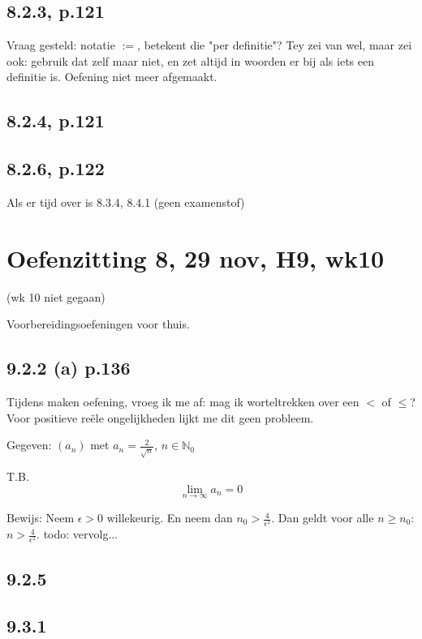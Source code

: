 \documentclass{article}
\begin{document}
\subsection{8.2.3, p.121}
Vraag gesteld: notatie $:=$, betekent die "per definitie"? Tey zei van wel, maar zei ook: gebruik dat zelf maar niet, en zet altijd in woorden er bij als iets een definitie is. 
Oefening niet meer afgemaakt. 

\subsection{8.2.4, p.121}
 
\subsection{8.2.6, p.122}

Als er tijd over is  8.3.4, 8.4.1 (geen examenstof) 

\section{Oefenzitting 8, 29 nov, H9, wk10}
(wk 10 niet gegaan) 

Voorbereidingsoefeningen voor thuis.


\subsection{9.2.2 (a) p.136}

Tijdens maken oefening, vroeg ik me af: mag ik worteltrekken over een $<$ of $\leq$? 
Voor positieve re\"ele ongelijkheden lijkt me dit geen probleem. 

Gegeven: $(a_n)$ met $a_n = \frac{2}{\sqrt{n}}$, $n \in \mathbb{N}_0$

T.B. \[
\lim_{n \to \infty} a_n = 0 \] 

Bewijs: 
Neem $\epsilon > 0$ willekeurig. En neem dan $n_0 > \frac{4}{\epsilon^2}$. Dan geldt voor alle $n \geq n_0$: $n > \frac{4}{\epsilon^2}$. 
todo: vervolg...



\subsection{9.2.5}

\subsection{9.3.1}
\end{document}
